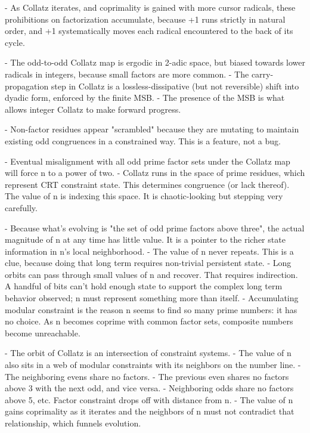 \documentclass[12pt]{article}
\theoremstyle{plain}
\theoremstyle{definition}
\begin{document}
- As Collatz iterates, and coprimality is gained with more cursor radicals, these prohibitions on factorization accumulate, because +1 runs strictly in natural order, and +1 systematically moves each radical encountered to the back of its cycle.


- The odd-to-odd Collatz map is ergodic in 2-adic space, but biased towards lower radicals in integers, because small factors are more common.
- The carry-propagation step in Collatz is a lossless-dissipative (but not reversible) shift into dyadic form, enforced by the finite MSB.
- The presence of the MSB is what allows integer Collatz to make forward progress.

- Non-factor residues appear "scrambled" because they are mutating to maintain existing odd congruences in a constrained way. This is a feature, not a bug.

- Eventual misalignment with all odd prime factor sets under the Collatz map will force n to a power of two.
- Collatz runs in the space of prime residues, which represent CRT constraint state. This determines congruence (or lack thereof). The value of n is indexing this space. It is chaotic-looking but stepping very carefully.

- Because what's evolving is "the set of odd prime factors above three", the actual magnitude of n at any time has little value. It is a pointer to the richer state information in n's local neighborhood.
- The value of n never repeats. This is a clue, because doing that long term requires non-trivial persistent state.
- Long orbits can pass through small values of n and recover. That requires indirection. A handful of bits can't hold enough state to support the complex long term behavior observed; n must represent something more than itself.
- Accumulating modular constraint is the reason n seems to find so many prime numbers: it has no choice. As n becomes coprime with common factor sets, composite numbers become unreachable.


- The orbit of Collatz is an intersection of constraint systems.
- The value of n also sits in a web of modular constraints with its neighbors on the number line.
  - The neighboring evens share no factors.
  - The previous even shares no factors above 3 with the next odd, and vice versa.
  - Neighboring odds share no factors above 5, etc. Factor constraint drops off with distance from n.
- The value of n gains coprimality as it iterates and the neighbors of n must not contradict that relationship, which funnels evolution.
\end{document}
